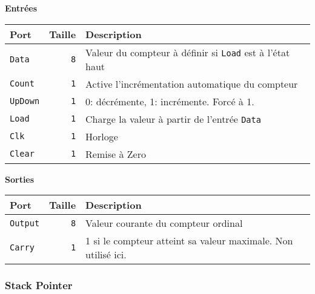 \documentclass{article}
\begin{document}

    \textbf{Entrées}\\

    \begin{tabular}{|l|r|l|}
        \hline
        \textbf{Port}  & \textbf{Taille} & \textbf{Description}                                            \\
        \hline

        \texttt{Data}  & \texttt{8}      & Valeur du compteur à définir si \texttt{Load} est à l'état haut \\
        \hline
        \texttt{Count} & \texttt{1}      & Active l'incrémentation automatique du compteur                 \\
        \hline
        \texttt{UpDown} & \texttt{1} & 0: décrémente, 1: incrémente.
        Forcé à 1. \\
        \hline
        \texttt{Load}  & \texttt{1}      & Charge la valeur à partir de l'entrée \texttt{Data}             \\
        \hline
        \texttt{Clk}   & \texttt{1}      & Horloge                                                         \\
        \hline
        \texttt{Clear} & \texttt{1}      & Remise à Zero                                                   \\
        \hline


        \hline
    \end{tabular}

    \vspace{1em}
    \textbf{Sorties}\\

    \begin{tabular}{|l|r|l|}
        \hline
        \textbf{Port}   & \textbf{Taille} & \textbf{Description}                \\
        \hline

        \hline
        \texttt{Output} & \texttt{8}      & Valeur courante du compteur ordinal \\
        \hline
        \texttt{Carry} & \texttt{1} & 1 si le compteur atteint sa valeur maximale.
        Non utilisé ici. \\

        \hline
    \end{tabular}

    \subsubsection{Stack Pointer}
\end{document}
